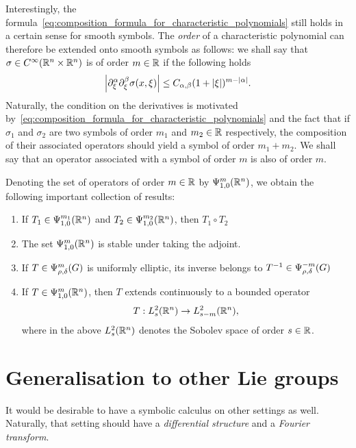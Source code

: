 Interestingly, the formula~\eqref{eq:composition_formula_for_characteristic_polynomials} still holds in a certain sense for smooth symbols.
The \emph{order} of a characteristic polynomial can therefore be extended onto smooth symbols as follows:
we shall say that $\sigma \in \SmoothFunctions {\R^n \times \R^n}$ is of order $m \in \R$
if the following holds
\begin{align*}
    \abs {\iD{\xi^\alpha, \xi^\beta} \sigma(x, \xi)} \leq C_{\alpha, \beta} (1 + \abs \xi)^{m - \abs \alpha}.
\end{align*}
Naturally, the condition on the derivatives is motivated by~\eqref{eq:composition_formula_for_characteristic_polynomials} and the fact that
if $\sigma_1$ and $\sigma_2$ are two symbols of order $m_1$ and $m_2 \in \R$ respectively,
the composition of their associated operators should yield a symbol of order $m_1 + m_2$.
We shall say that an operator associated with a symbol of order $m$ is also of order $m$.

Denoting the set of operators of order $m \in \R$ by $\OperatorClass [\R^n] m {1, 0}$,
we obtain the following important collection of results:
\begin{enumerate}
    \item
        If $T_1 \in \OperatorClass [\R^n] {m_1} {1, 0}$
        and $T_2 \in \OperatorClass [\R^n] {m_2} {1, 0}$,
        then $T_1 \circ T_2$
    \item
        The set $\OperatorClass [\R^n] m {1, 0}$ is stable under taking the adjoint.
    \item
        If $T \in \OperatorClass m {\rho, \delta}$ is uniformly elliptic,
        its inverse belongs to $T^{-1} \in \OperatorClass {-m} {\rho, \delta}$
    \item
        If $T \in \OperatorClass [\R^n] m {1, 0}$,
        then $T$ extends continuously to a bounded operator
        \begin{align*}
            T : \Sobolev [\R^n] s \to \Sobolev [\R^n] {s - m},
        \end{align*}
        where in the above $\Sobolev [\R^n] s$ denotes the Sobolev space of order $s \in \R$.
\end{enumerate}

\section{Generalisation to other Lie groups}

It would be desirable to have a symbolic calculus on other settings as well.
Naturally, that setting should have a \emph{differential structure} and a \emph{Fourier transform}.

